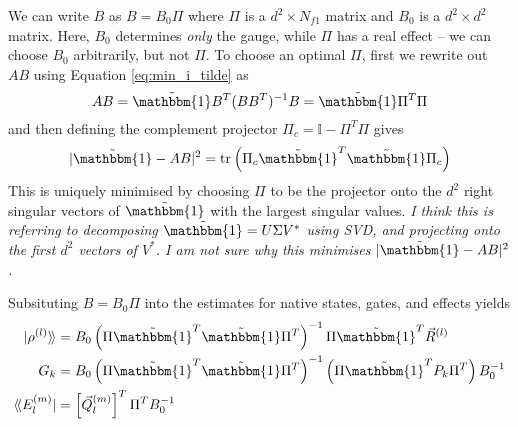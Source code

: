 We can write $B$ as $B = B_0 \Pi$ where $\Pi$ is a $d^2 \times N_{f1}$ matrix and $B_0$ is a $d^2
\times d^2$ matrix. Here, $B_0$ determines \textit{only} the gauge, while $\Pi$ has a real effect --
we can choose $B_0$ arbitrarily, but not $\Pi$. To choose an optimal $\Pi$, first we rewrite out
$AB$ using Equation \ref{eq:min_i_tilde} as
\begin{equation}
    AB = \tilde{\mathbbm{1}} B^T (B B^T)^{-1} B = \tilde{\mathbbm{1}} \Pi^T \Pi
\end{equation}
and then defining the complement projector $\Pi_c = \mathbb{I} - \Pi^T \Pi$ gives
\begin{equation}
    |\tilde{\mathbbm{1}} - AB|^2 = \tr{\Pi_c \tilde{\mathbbm{1}}^T \tilde{\mathbbm{1}} \Pi_c}
\end{equation}
This is uniquely minimised by choosing $\Pi$ to be the projector onto the $d^2$ right singular
vectors of $\tilde{\mathbbm{1}}$ with the largest singular values. \textit{I think this is referring
to decomposing $\tilde{\mathbbm{1}} = U \Sigma V^*$ using SVD, and projecting onto the first $d^2$
vectors of $V^*$. I am not sure why this minimises $|\tilde{\mathbbm{1}} - AB|^2$.}

Subsituting $B = B_0 \Pi$ into the estimates for native states, gates, and effects yields
\begin{align}
    \superket{\rho^{(l)}} &= B_0 \left(\Pi \tilde{\mathbbm{1}}^T \tilde{\mathbbm{1}} \Pi^T \right)^{-1} \Pi \tilde{\mathbbm{1}}^T \vec{R}^{(l)} \\
    G_k                   &= B_0 \left(\Pi \tilde{\mathbbm{1}}^T \tilde{\mathbbm{1}} \Pi^T \right)^{-1} \left(\Pi \tilde{\mathbbm{1}}^T P_k \Pi^T \right) B_0^{-1} \\
    \superbra{E_l^{(m)}}  &= \left[\vec{Q}_l^{(m)}\right]^T \Pi^T B_0^{-1}
\end{align}